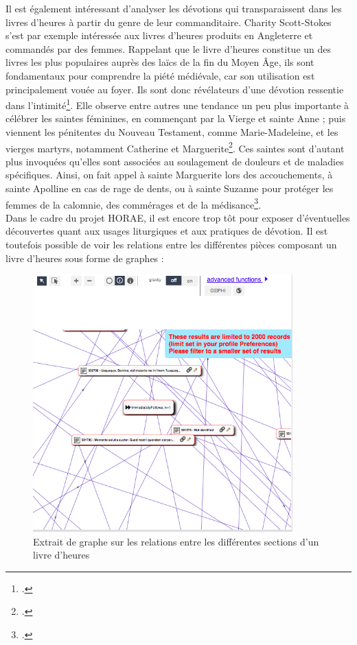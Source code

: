 \documentclass[a4paper,12pt,twoside]{book}
\begin{document}
Il est également intéressant d'analyser les dévotions qui transparaissent dans les livres d'heures à partir du genre de leur commanditaire. Charity Scott-Stokes s'est par exemple intéressée aux livres d'heures produits en Angleterre et commandés par des femmes. Rappelant que le livre d'heures constitue un des livres les plus populaires auprès des laïcs de la fin du Moyen Âge, ils sont fondamentaux pour comprendre la piété médiévale, car son utilisation est principalement vouée au foyer. Ils sont donc révélateurs d'une dévotion ressentie dans l'intimité\footcite[p. 1]{Women_Books_Hours}. Elle observe entre autres une tendance un peu plus importante à célébrer les saintes féminines, en commençant par la Vierge et sainte Anne ; puis viennent les pénitentes du Nouveau Testament, comme Marie-Madeleine, et les vierges martyrs, notamment Catherine et Marguerite\footcite[p. 14]{Women_Books_Hours}. Ces saintes sont d'autant plus invoquées qu'elles sont associées au soulagement de douleurs et de maladies spécifiques. Ainsi, on fait appel à sainte Marguerite lors des accouchements, à sainte Apolline en cas de rage de dents, ou à sainte Suzanne pour protéger les femmes de la calomnie, des commérages et de la médisance\footcite[p. 15]{Women_Books_Hours}. \\

Dans le cadre du projet HORAE, il est encore trop tôt pour exposer d'éventuelles découvertes quant aux usages liturgiques et aux pratiques de dévotion. Il est toutefois possible de voir les relations entre les différentes pièces composant un livre d'heures sous forme de graphes : 
    \begin{figure}[!h]
    \centering
    \includegraphics[width=10cm]{img/DataViz/réseau_section_livres_heures.png}
    \caption{Extrait de graphe sur les relations entre les différentes sections d'un livre d'heures}
    \end{figure}
    \clearpage
\end{document}
